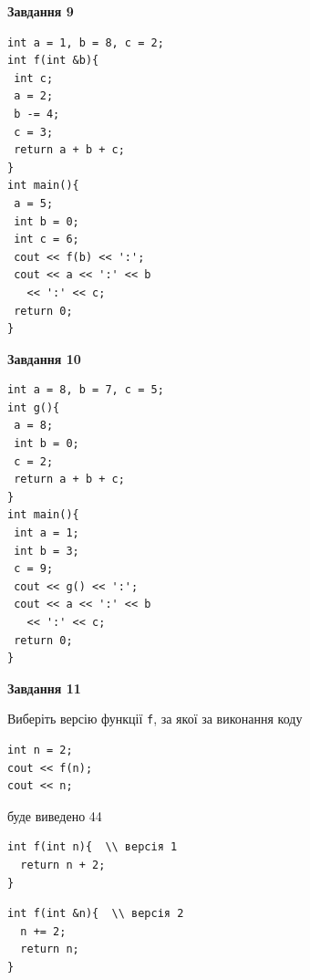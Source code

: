 \documentclass[12pt, ukrainian]{article}
\def\code#1{\Verb!#1!}
\begin{document}
{\begin {large}
\begin{minipage}[t]{11.0cm}
\end{minipage}


\begin{minipage}[t]{7.0cm}

\begin{center}
\textbf{Завдання 9}
\end{center}
\vspace{-8mm}

\begin{verbatim}
int a = 1, b = 8, c = 2;
int f(int &b){
 int c;
 a = 2;
 b -= 4;
 c = 3;
 return a + b + c;
}
int main(){
 a = 5;
 int b = 0;
 int c = 6;
 cout << f(b) << ':';
 cout << a << ':' << b 
   << ':' << c;
 return 0;
}
\end{verbatim}



\begin{center}
\textbf{Завдання 10}
\end{center}
\vspace{-8mm}

\begin{verbatim}
int a = 8, b = 7, c = 5;
int g(){
 a = 8;
 int b = 0;
 c = 2;
 return a + b + c;
}
int main(){
 int a = 1;
 int b = 3;
 c = 9;
 cout << g() << ':';
 cout << a << ':' << b 
   << ':' << c;
 return 0;
}
\end{verbatim}

\end{minipage}
\vline \hspace{1mm}
\begin{minipage}[t]{11.0cm}

\begin{center}
\textbf{Завдання 11}
\end{center}
Виберіть версію функції \code{f}, за якої за виконання коду
\begin{verbatim}
int n = 2;
cout << f(n);
cout << n;
\end{verbatim}

буде виведено 44

\begin{verbatim}
int f(int n){  \\ версія 1
  return n + 2;
}
\end{verbatim}

\vspace{-8mm}\begin{verbatim}
int f(int &n){  \\ версія 2
  n += 2;
  return n;
}
\end{verbatim}


\end{minipage}
\end{large}}
\end{document}
